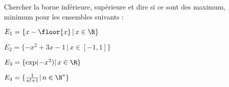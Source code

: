 
\begin{exercice}
Chercher la borne inférieure, supérieure et dire si ce sont des maximum, minimum pour les ensembles suivants : 

\begin{enumerate}
\begin{minipage}[t]{0.45\textwidth}
\item $E_1= \{ x- \floor{x}\, |\, x\in \R\}$
\item $E_2= \{ -x^2+3x -1\, |\, x\in [-1,1]\}$

\end{minipage}
\begin{minipage}[t]{0.45\textwidth}
\item $E_3= \{\exp(-x^2) |\, x\in \R \}$
\item $E_4= \{\frac{1}{n!+1}|\, n\in \N^* \}$
\end{minipage}
\end{enumerate}

\end{exercice}